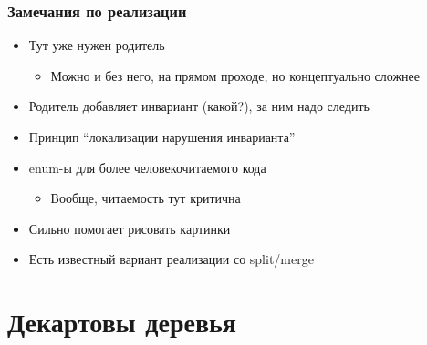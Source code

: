 \documentclass{../../slides-style}
\begin{document}
    \begin{frame}
        \frametitle{Замечания по реализации}
        \begin{itemize}
            \item Тут уже нужен родитель
            \begin{itemize}
                \item Можно и без него, на прямом проходе, но концептуально сложнее
            \end{itemize}
            \item Родитель добавляет инвариант (какой?), за ним надо следить
            \item Принцип ``локализации нарушения инварианта''
            \item enum-ы для более человекочитаемого кода
            \begin{itemize}
                \item Вообще, читаемость тут критична
            \end{itemize}
            \item Сильно помогает рисовать картинки
            \item Есть известный вариант реализации со split/merge
        \end{itemize}
    \end{frame}

    \section{Декартовы деревья}
\end{document}
